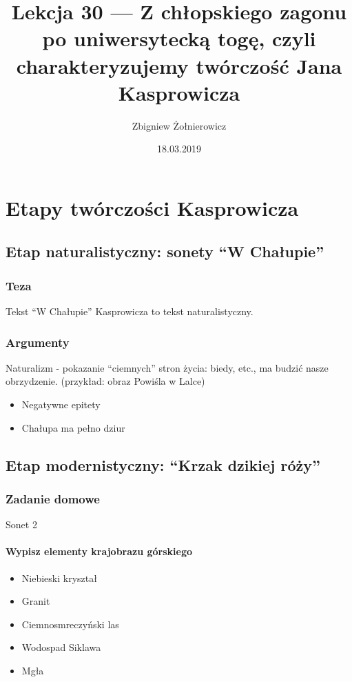 \documentclass{article}
\begin{document}
\title{Lekcja 30 --- Z chłopskiego zagonu po uniwersytecką togę, czyli charakteryzujemy twórczość Jana Kasprowicza}
\author{Zbigniew Żołnierowicz}
\date{18.03.2019}
\maketitle
\section{Etapy twórczości Kasprowicza}
\subsection{Etap naturalistyczny: sonety ``W Chałupie''}
\subsubsection{Teza}
Tekst ``W Chałupie'' Kasprowicza to tekst naturalistyczny.
\subsubsection{Argumenty}
Naturalizm - pokazanie ``ciemnych'' stron życia: biedy, etc., ma budzić nasze obrzydzenie. (przykład: obraz Powiśla w Lalce)
\begin{itemize}
    \item Negatywne epitety
    \item Chałupa ma pełno dziur
\end{itemize}
\subsection{Etap modernistyczny: ``Krzak dzikiej róży''}
\subsubsection{Zadanie domowe}
Sonet 2
\paragraph{Wypisz elementy krajobrazu górskiego}
\begin{itemize}
    \item Niebieski kryształ
    \item Granit
    \item Ciemnosmreczyński las
    \item Wodospad Siklawa
    \item Mgła
\end{itemize}
\end{document}
